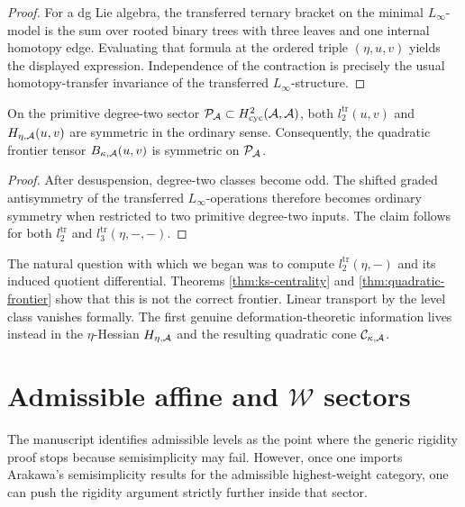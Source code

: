 \begin{proof}
For a dg Lie algebra, the transferred ternary bracket on the minimal
$L_\infty$-model is the sum over rooted binary trees with three leaves and one
internal homotopy edge.  Evaluating that formula at the ordered triple
$(\eta,u,v)$ yields the displayed expression.  Independence of the contraction is
precisely the usual homotopy-transfer invariance of the transferred
$L_\infty$-structure.\end{proof}

\begin{lemma}
\label{lem:shifted-symmetry-H}
On the primitive degree-two sector $\mathcal{P}_{\mathcal{A}}\subset H^2_{\mathrm{cyc}}(\mathcal{A},\mathcal{A})$,
both $l_2^{\mathrm{tr}}(u,v)$ and $H_{\eta,\mathcal{A}}(u,v)$ are symmetric in the
ordinary sense.  Consequently, the quadratic frontier tensor
$B_{\kappa,\mathcal{A}}(u,v)$ is symmetric on $\mathcal{P}_{\mathcal{A}}$.
\end{lemma}

\begin{proof}
After desuspension, degree-two classes become odd.  The shifted graded
antisymmetry of the transferred $L_\infty$-operations therefore becomes ordinary
symmetry when restricted to two primitive degree-two inputs.  The claim follows
for both $l_2^{\mathrm{tr}}$ and $l_3^{\mathrm{tr}}(\eta,-,-)$.\end{proof}

\begin{remark}
\label{rem:frontier-moved}
The natural question with which we began was to compute
$l_2^{\mathrm{tr}}(\eta,-)$ and its induced quotient differential.  Theorems
\ref{thm:ks-centrality} and \ref{thm:quadratic-frontier} show that this is not
the correct frontier.  Linear transport by the level class vanishes formally.
The first genuine deformation-theoretic information lives instead in the
$\eta$-Hessian $H_{\eta,\mathcal{A}}$ and the resulting quadratic cone
$\mathcal{C}_{\kappa,\mathcal{A}}$.
\end{remark}

\section{Admissible affine and \texorpdfstring{$\mathcal{W}$}{W} sectors}
\label{sec:admissible-sectors}

The manuscript identifies admissible levels as the point where the generic
rigidity proof stops because semisimplicity may fail.  However, once one imports
Arakawa's semisimplicity results for the admissible highest-weight category,
one can push the rigidity argument strictly further inside that sector.

